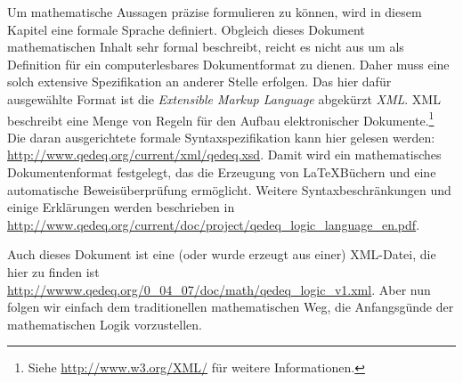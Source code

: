 \documentclass[a4paper,german,10pt,twoside]{book}
\theoremstyle{definition}
\theoremstyle{remark}
\begin{document}
Um mathematische Aussagen pr{\"a}zise formulieren zu k{\"o}nnen, wird in diesem Kapitel eine formale Sprache definiert. Obgleich dieses Dokument mathematischen Inhalt sehr formal beschreibt, reicht es nicht aus um als Definition f{\"u}r ein computerlesbares Dokumentformat zu dienen. Daher muss eine solch extensive Spezifikation an anderer Stelle erfolgen.
Das hier daf{\"u}r ausgew{\"a}hlte Format ist die \emph{Extensible Markup Language} abgek{\"u}rzt \emph{XML}. XML beschreibt eine Menge von Regeln f{\"u}r den Aufbau elektronischer Dokumente.\footnote{Siehe \url{http://www.w3.org/XML/} f{\"u}r weitere Informationen.} Die daran ausgerichtete formale Syntaxspezifikation kann hier gelesen werden: \url{http://www.qedeq.org/current/xml/qedeq.xsd}.
Damit wird ein mathematisches Dokumentenformat festgelegt, das die Erzeugung von \LaTeX B{\"u}chern und eine automatische Beweis{\"u}berpr{\"u}fung erm{\"o}glicht. 
Weitere Syntaxbeschr{\"a}nkungen und einige Erkl{\"a}rungen werden beschrieben in \url{http://www.qedeq.org/current/doc/project/qedeq_logic_language_en.pdf}.

\par
Auch dieses Dokument ist eine (oder wurde erzeugt aus einer) XML-Datei, die hier zu finden ist \url{http://wwww.qedeq.org/0_04_07/doc/math/qedeq_logic_v1.xml}.
Aber nun folgen wir einfach dem traditionellen mathematischen Weg, die Anfangsg{\"u}nde der mathematischen Logik vorzustellen.
\end{document}
